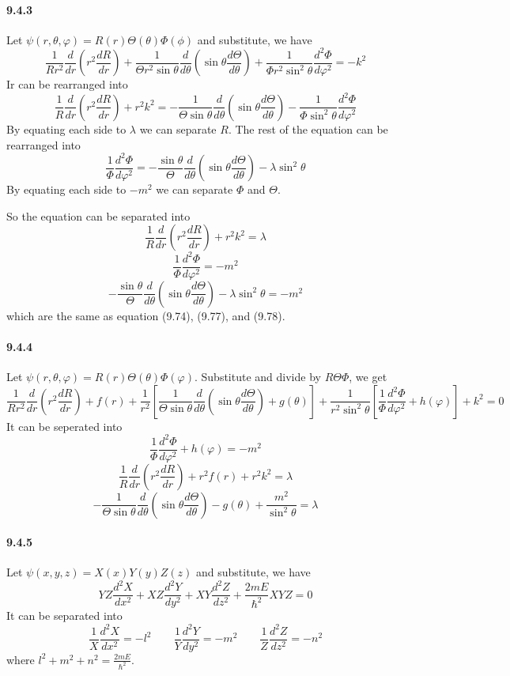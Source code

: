 \documentclass[a4paper]{article}
\begin{document}
\paragraph{9.4.3}
Let $\psi(r,\theta,\varphi)=R(r)\Theta(\theta)\Phi(\phi)$ and substitute, we have
\[
\frac{1}{Rr^2}\frac{d}{dr}\left(r^2\frac{dR}{dr}\right)+\frac{1}{\Theta r^2\sin\theta}\frac{d}{d\theta}\left(\sin\theta\frac{d\Theta}{d\theta} \right)+\frac{1}{\Phi r^2\sin^2\theta}\frac{d^2\Phi}{d\varphi^2}=-k^2
\]
Ir can be rearranged into
\[
\frac{1}{R}\frac{d}{dr}\left(r^2\frac{dR}{dr} \right)+r^2k^2=-\frac{1}{\Theta\sin\theta}\frac{d}{d\theta}\left(\sin\theta\frac{d\Theta}{d\theta} \right)-\frac{1}{\Phi\sin^2\theta}\frac{d^2\Phi}{d\varphi^2}
\]
By equating each side to $\lambda$ we can separate $R$. The rest of the equation can be rearranged into
\[
\frac{1}{\Phi}\frac{d^2\Phi}{d\varphi^2}=-\frac{\sin\theta}{\Theta}\frac{d}{d\theta}\left(\sin\theta\frac{d\Theta}{d\theta} \right)-\lambda\sin^2\theta
\]
By equating each side to $-m^2$ we can separate $\Phi$ and $\Theta$. 

So the equation can be separated into
\[
\frac{1}{R}\frac{d}{dr}\left(r^2\frac{dR}{dr} \right)+r^2k^2=\lambda
\]
\[
\frac{1}{\Phi}\frac{d^2\Phi}{d\varphi^2}=-m^2
\]
\[
-\frac{\sin\theta}{\Theta}\frac{d}{d\theta}\left(\sin\theta\frac{d\Theta}{d\theta} \right)-\lambda\sin^2\theta=-m^2
\]
which are the same as equation (9.74), (9.77), and (9.78).

\paragraph{9.4.4}
Let $\psi(r,\theta,\varphi)=R(r)\Theta(\theta)\Phi(\varphi)$. Substitute and divide by $R\Theta\Phi$, we get
\[
\frac{1}{Rr^2}\frac{d}{dr}\left(r^2\frac{dR}{dr} \right)+f(r)+\frac{1}{r^2}\left[\frac{1}{\Theta\sin\theta}\frac{d}{d\theta}\left(\sin\theta\frac{d\Theta}{d\theta} \right)+g(\theta) \right]+\frac{1}{r^2\sin^2\theta}\left[\frac{1}{\Phi}\frac{d^2\Phi}{d\varphi^2}+h(\varphi) \right]+k^2=0
\]
It can be seperated into
\[
\frac{1}{\Phi}\frac{d^2\Phi}{d\varphi^2}+h(\varphi)=-m^2
\]
\[
\frac{1}{R}\frac{d}{dr}\left(r^2\frac{dR}{dr} \right)+r^2f(r)+r^2k^2=\lambda
\]
\[
-\frac{1}{\Theta\sin\theta}\frac{d}{d\theta}\left(\sin\theta\frac{d\Theta}{d\theta} \right)-g(\theta)+\frac{m^2}{\sin^2\theta}=\lambda
\]

\paragraph{9.4.5}
Let $\psi(x,y,z)=X(x)Y(y)Z(z)$ and substitute, we have
\[
YZ\frac{d^2X}{dx^2}+XZ\frac{d^2Y}{dy^2}+XY\frac{d^2Z}{dz^2}+\frac{2mE}{\hbar^2}XYZ=0
\]
It can be separated into
\[
\frac{1}{X}\frac{d^2X}{dx^2}=-l^2\qquad \frac{1}{Y}\frac{d^2Y}{dy^2}=-m^2\qquad \frac{1}{Z}\frac{d^2Z}{dz^2}=-n^2
\]
where $l^2+m^2+n^2=\frac{2mE}{\hbar^2}$.
\medskip
\end{document}

